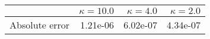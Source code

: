 \begin{tabular}{lrrr}
\toprule
 & $\kappa = 10.0$ & $\kappa = 4.0$ & $\kappa = 2.0$ \\
\midrule
Absolute error & 1.21e-06 & 6.02e-07 & 4.34e-07 \\
\bottomrule
\end{tabular}
